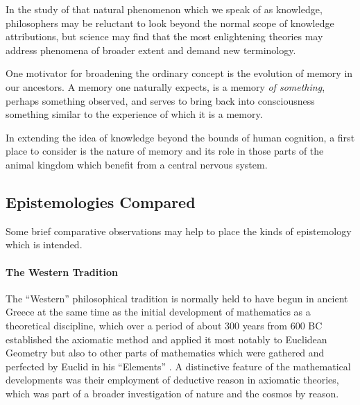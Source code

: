 \documentclass[10pt,titlepage]{book}
\newcommand{\ignore}[1]{}
\begin{document}
In the study of that natural phenomenon which we speak of as knowledge, philosophers may be reluctant to look beyond the normal scope of knowledge attributions, but science may find that the most enlightening theories may address phenomena of broader extent and demand new terminology.

One motivator for broadening the ordinary concept is the evolution of memory in our ancestors.
A memory one naturally expects, is a memory \emph{of something}, perhaps something observed, and serves to bring back into consciousness something similar to the experience of which it is a memory.


In extending the idea of knowledge beyond the bounds of human cognition, a first place to consider is the nature of memory and its role in those parts of the animal kingdom which benefit from a central nervous system.

\ignore{
The following concepts are useful in characterising the kinds of knowledge and its pre-cursors which become a significant part of the evolutionary history beyond its particular manifestations in homo sapiens.

\begin{itemize}
\item information
\item representation, model
\item declarative knowledge
\item episteme
\item epistemology
\end{itemize}

}%

\subsection{Epistemologies Compared}

Some brief comparative observations may help to place the kinds of epistemology which is intended.

\paragraph{The Western Tradition}

The ``Western'' philosophical tradition is normally held to have begun in ancient Greece at the same time as the initial development of mathematics as a theoretical discipline, which over a period of about 300 years from 600 BC established the axiomatic method and applied it most notably to Euclidean Geometry but also to other parts of mathematics which were gathered and perfected by Euclid in his ``Elements'' \cite{euclidL1}.
A distinctive feature of the mathematical developments was their employment of deductive reason in axiomatic theories, which was part of a broader investigation of nature and the cosmos by reason.
\end{document}

